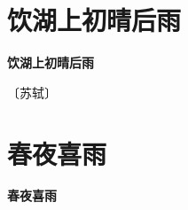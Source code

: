 \documentclass[12pt,UTF-8,openany,fontset=none]{ctexbook}
\begin{document}
\vspace{8pt}
\clearpage


\section{饮湖上初晴后雨}



\begin{center}
    {\bfseries 饮湖上初晴后雨}
\end{center}

\begin{center}
    \vspace{10pt}
    
    \begin{large}
        
        〔苏轼〕
        
    \end{large}
    
    \vspace{8pt}
    
    \begin{huge}
        
        \phantom{。}

        \phantom{。}
        
        \phantom{。}

        \phantom{。}
        
    \end{huge}
    
\end{center}

\vspace{8pt}
\clearpage


\section{春夜喜雨}



\begin{center}
    {\bfseries 春夜喜雨}
\end{center}
\end{document}
